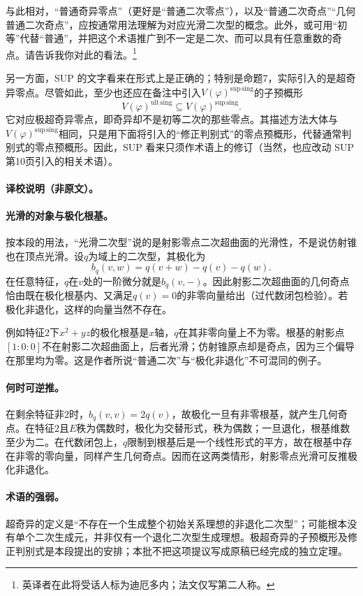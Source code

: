 与此相对，“普通奇异零点”（更好是“普通二次零点”），以及“普通二次奇点”“几何普通二次奇点”，应按通常用法理解为对应光滑二次型的概念。此外，或可用“初等”代替“普通”，并把这个术语推广到不一定是二次、而可以具有任意重数的奇点。请告诉我你对此的看法。\footnote{英译者在此将受话人标为迪厄多内；法文仅写第二人称。}

另一方面，SUP 的文字看来在形式上是正确的；特别是命题7，实际引入的是超奇异零点。尽管如此，至少也还应在备注中引入$V(\varphi)^{\mathrm{sup\,sing}}$的子预概形
\[
V(\varphi)^{\mathrm{ult\,sing}}
\subseteq V(\varphi)^{\mathrm{sup\,sing}}.
\]
它对应极超奇异零点，即奇异却不是初等二次的那些零点。其描述方法大体与$V(\varphi)^{\mathrm{sup\,sing}}$相同，只是用下面将引入的“修正判别式”的零点预概形，代替通常判别式的零点预概形。因此，SUP 看来只须作术语上的修订（当然，也应改动 SUP 第10页引入的相关术语）。
\paragraph{译校说明（非原文）。}
\paragraph{光滑的对象与极化根基。}
按本段的用法，“光滑二次型”说的是射影零点二次超曲面的光滑性，不是说仿射锥也在顶点光滑。设$q$为域上的二次型，其极化为
\[
b_q(v,w)=q(v+w)-q(v)-q(w).
\]
在任意特征，$q$在$v$处的一阶微分就是$b_q(v,-)$。因此射影二次超曲面的几何奇点恰由既在极化根基内、又满足$q(v)=0$的非零向量给出（过代数闭包检验）。若极化非退化，这样的向量当然不存在。

例如特征$2$下$x^2+yz$的极化根基是$x$轴，$q$在其非零向量上不为零。根基的射影点$[1:0:0]$不在射影二次超曲面上，后者光滑；仿射锥原点却是奇点，因为三个偏导在那里均为零。这是作者所说“普通二次”与“极化非退化”不可混同的例子。

\paragraph{何时可逆推。}
在剩余特征非$2$时，$b_q(v,v)=2q(v)$，故极化一旦有非零根基，就产生几何奇点。在特征$2$且$E$秩为偶数时，极化为交替形式，秩为偶数；一旦退化，根基维数至少为二。在代数闭包上，$q$限制到根基后是一个线性形式的平方，故在根基中存在非零的零向量，同样产生几何奇点。因而在这两类情形，射影零点光滑可反推极化非退化。

\paragraph{术语的强弱。}
超奇异的定义是“不存在一个生成整个初始关系理想的非退化二次型”；可能根本没有单个二次生成元，并非仅有一个退化二次型生成理想。极超奇异的子预概形及修正判别式是本段提出的安排；本批不把这项提议写成原稿已经完成的独立定理。
\endgroup
